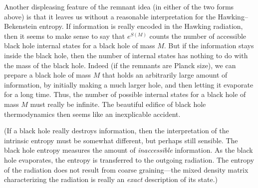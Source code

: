 Another displeasing feature of the remnant idea (in either of the two forms
above) is that it leaves us without a
reasonable interpretation for the Hawking--Bekenstein entropy.
If information is really encoded in the Hawking radiation, then it seems to
make sense to say that $e^{S(M)}$ counts the number of accessible black hole
internal states for a black hole of mass $M$.  But if the information stays
inside the black hole, then the number of internal states has nothing to do
with the mass of the black hole.
Indeed (if the remnants are Planck size), we can prepare a black hole of mass
$M$ that holds an arbitrarily large amount of information, by initially making
a much larger hole, and then letting it evaporate for a long time.  Thus, the
number of possible internal states for a black hole of mass $M$ must really be
infinite.
The beautiful edifice of black hole thermodynamics then seems like
an inexplicable accident.

(If a black hole really destroys information, then the interpretation of the
intrinsic entropy must be somewhat different, but perhaps still
sensible.  The black hole entropy measures the amount of {\it inaccessible}
information.  As the black hole evaporates, the entropy is transferred to the
outgoing radiation.  The entropy of the radiation does not result from coarse
graining---the mixed density matrix characterizing the radiation is really an
{\it exact} description of its state.)

